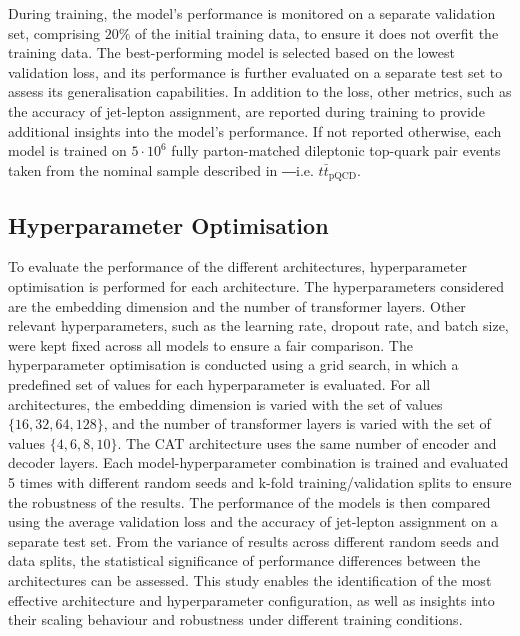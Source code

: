 During training, the model's performance is monitored on a separate validation set, comprising $ 20\%$ of the initial training data, to ensure it does not overfit the training data. The best-performing model is selected based on the lowest validation loss, and its performance is further evaluated on a separate test set to assess its generalisation capabilities. In addition to the loss, other metrics, such as the accuracy of jet-lepton assignment, are reported during training to provide additional insights into the model's performance. If not reported otherwise, each model is trained on $5\cdot 10^{6}$ fully parton-matched dileptonic top-quark pair events taken from the nominal \ttbar sample described in ―i.e. ${t\bar{t}}_{\text{pQCD}}$.

\subsection{Hyperparameter Optimisation}
\label{sec:hyperparameter-optimisation}
To evaluate the performance of the different architectures, hyperparameter optimisation is performed for each architecture. The hyperparameters considered are the embedding dimension  and the number of transformer layers.
Other relevant hyperparameters, such as the learning rate, dropout rate, and batch size, were kept fixed across all models to ensure a fair comparison. The hyperparameter optimisation is conducted using a grid search, in which a predefined set of values for each hyperparameter is evaluated.
For all architectures, the embedding dimension is varied with the set of values $\{16,32,64,128\}$, and the number of transformer layers is varied with the set of values $\{4,6,8,10\}$. The CAT architecture uses the same number of encoder and decoder layers. Each model-hyperparameter combination is trained and evaluated 5 times with different random seeds and k-fold training/validation splits to ensure the robustness of the results. The performance of the models is then compared using the average validation loss and the accuracy of jet-lepton assignment on a separate test set. From the variance of results across different random seeds and data splits, the statistical significance of performance differences between the architectures can be assessed. This study enables the identification of the most effective architecture and hyperparameter configuration, as well as insights into their scaling behaviour and robustness under different training conditions.

